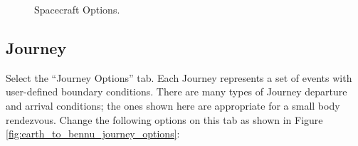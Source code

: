 \documentclass[11pt]{article}
\begin{document}
\begin{figure}[H]
	\centering
	\caption{\label{fig:spacecraft_mission_options}Spacecraft Options.}
\end{figure}

\subsection{Journey}
\label{sec:journey}

Select the ``Journey Options'' tab. Each Journey represents a set of events with user-defined boundary conditions. There are many types of Journey departure and arrival conditions; the ones shown here are appropriate for a small body rendezvous. Change the following options on this tab as shown in Figure \ref{fig:earth_to_bennu_journey_options}:
\end{document}
